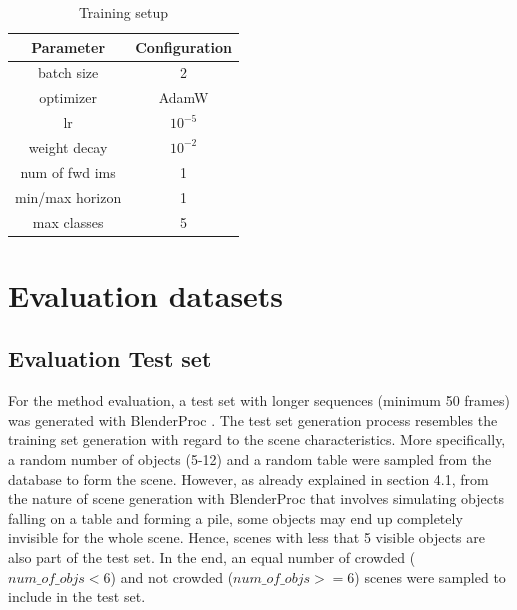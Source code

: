 


\begin{table} [h!]
\caption{Training setup}
\centering

\begin{tabular}{|c|c|} 
\hline
\textbf{Parameter}    & \textbf{Configuration} \\ 
\hline
batch size & 2   \\
optimizer  & AdamW \\
lr         & $10^{-5}$ \\
weight decay & $10^{-2}$ \\
num of fwd ims & 1 \\
min/max horizon & 1 \\
max classes & 5 \\
\hline
\end{tabular}
 \label{Tab:training_setup}
\end{table}



\section{Evaluation datasets}
\subsection{Evaluation Test set}
For the method evaluation, a test set with longer sequences (minimum 50 frames) was generated with BlenderProc \parencite{denninger2019blenderproc}. The test set generation process resembles the training set generation with regard to the scene characteristics. More specifically, a random number of objects (5-12) and a random table were sampled from the database to form the scene. However, as already explained in section 4.1, from the nature of scene generation with BlenderProc that involves simulating objects falling on a table and forming a pile, some objects may end up completely invisible for the whole scene. Hence, scenes with less that 5 visible objects are also part of the test set. In the end, an equal number of crowded ($num\_of\_objs <6$) and not crowded ($num\_of\_objs >=6$) scenes were sampled to include in the test set. \par

